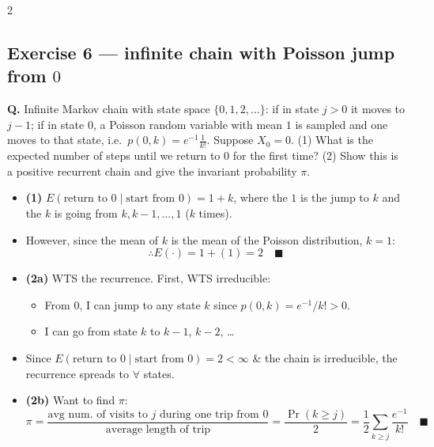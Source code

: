 \documentclass[8pt,letterpaper]{extarticle}
\begin{document}
\begin{multicols}{2}
\subsection{Exercise 6 --- infinite chain with Poisson jump from $0$}
\textbf{Q.} Infinite Markov chain with state space $\{0,1,2,\dots\}$: if in state $j>0$ it moves to $j-1$; if in state $0$, a Poisson random variable with mean $1$ is sampled and one moves to that state, i.e.\ $p(0,k)=e^{-1}\frac{1}{k!}$. Suppose $X_0=0$. (1) What is the expected number of steps until we return to $0$ for the first time? (2) Show this is a positive recurrent chain and give the invariant probability $\pi$.
\begin{itemize}
  \item \textbf{(1)} $E(\text{return to }0\mid\text{start from }0)=1+k$, where the $1$ is the jump to $k$ and the $k$ is going from $k,k-1,\dots,1$ ($k$ times).
  \item However, since the mean of $k$ is the mean of the Poisson distribution, $k=1$:
    \[ \therefore E(\cdot)=1+(1)=2 \quad \blacksquare \]
  \item \textbf{(2a)} WTS the recurrence. First, WTS irreducible:
    \begin{itemize}
      \item From $0$, I can jump to any state $k$ since $p(0,k)=e^{-1}/k!>0$.
      \item I can go from state $k$ to $k-1$, $k-2$, \dots
    \end{itemize}
  \item Since $E(\text{return to }0\mid\text{start from }0)=2<\infty$ \& the chain is irreducible, the recurrence spreads to $\forall$ states.
  \item \textbf{(2b)} Want to find $\pi$:
    \[ \pi=\frac{\text{avg num.\ of visits to } j \text{ during one trip from } 0}{\text{average length of trip}}
        =\frac{\Pr(k\ge j)}{2}=\frac{1}{2}\sum_{k\ge j}\frac{e^{-1}}{k!} \quad \blacksquare \]
\end{itemize}


\end{multicols}
\end{document}
